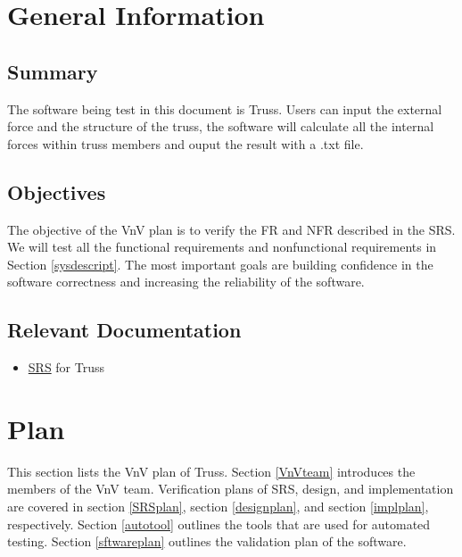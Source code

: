 \documentclass[12pt, titlepage]{article}
\begin{document}
\section{General Information} \label{Geninf}

\subsection{Summary}

The software being test in this document is Truss. Users can input the external 
force and the structure of the truss, the software will calculate all the 
internal forces within truss members and ouput the result with a .txt file. 


\subsection{Objectives}
The objective of the VnV plan is to verify the FR and NFR described in the SRS. 
We will test all the functional requirements and nonfunctional requirements in 
Section \ref{sysdescript}. The most important goals are building confidence 
in the software correctness and increasing the reliability of the software. 

\subsection{Relevant Documentation}

\begin{itemize}
	\item 
	\href{https://github.com/tingyuw/cas741/blob/master/docs/SRS/SRS.pdf}{SRS} 
	for Truss
\end{itemize}


\section{Plan} \label{verplan}
This section lists the VnV plan of Truss. Section \ref{VnVteam} introduces the 
members of the VnV team. Verification plans of SRS, design, and implementation 
are covered in section \ref{SRSplan}, section \ref{designplan}, and section 
\ref{implplan}, respectively. Section \ref{autotool} outlines the tools that 
are used for automated testing. Section \ref{sftwareplan} outlines the 
validation plan of the software.
\end{document}
